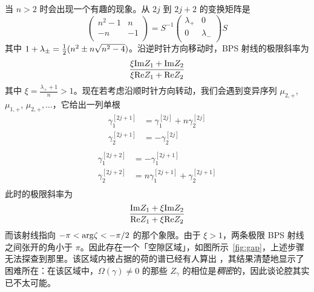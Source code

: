 当 $n>2$ 时会出现一个有趣的现象。从 $2j$ 到 $2j+2$ 的变换矩阵是
%
\begin{equation}
\begin{pmatrix} n^2 -1 & n \\ -n &  -1 \\ \end{pmatrix} = S^{-1} \begin{pmatrix} \lambda_+ & 0 \\
0 & \lambda_- \\ \end{pmatrix} S
\end{equation}
%
其中 $1+\lambda_\pm = \tfrac{1}{2} (n^2  \pm n \sqrt{n^2-4} ) $。沿逆时针方向移动时，BPS 射线的极限斜率为
%
\begin{equation}\label{eq:slope-ccw}
\frac{ \xi {\rm Im}Z_1 +   {\rm Im}Z_2 }{\xi {\rm Re} Z_1 +   {\rm Re} Z_2}
\end{equation}
%
其中 $\xi = \frac{\lambda_+ +1 }{n} > 1$。现在若考虑沿顺时针方向转动，我们会遇到变异序列 $\mu_{2,+}$, $\mu_{1,+}$, $\mu_{2,+},\dots$，它给出一列单根
%
\begin{equation}
\begin{split}
\gamma_1^{[2j+1]} & =   \gamma_1^{[2j]} + n   \gamma_2^{[2j]} \\
\gamma_2^{[2j+1]} & =  -   \gamma_2^{[2j]} \\
\end{split}
\end{equation}
%
\begin{equation}
\begin{split}
\gamma_1^{[2j+2]} & =     -\gamma_1^{[2j+1]}    \\
\gamma_2^{[2j+2]} & = n \gamma_1^{[2j+1]} + \gamma_2^{[2j+1]}  \\
\end{split}
\end{equation}
%
此时的极限斜率为
%
\begin{equation}\label{eq:slope-cw}
\frac{ {\rm Im}Z_1 +  \xi  {\rm Im}Z_2 }{  {\rm Re} Z_1 +  \xi {\rm Re} Z_2}
\end{equation}
%
而该射线指向 $-\pi < {\rm arg}\zeta < -\pi/2$ 的那个象限。由于 $\xi >1$，两条极限 BPS 射线之间张开的角小于 $\pi$。因此存在一个「空隙区域」，如图所示~\ref{fig:gap}，上述步骤无法探查到那里。该区域内被占据的荷的谱已经有人算出 \cite{gctv}，其结果清楚地显示了困难所在：在该区域中，$\Omega(\gamma) \neq 0$ 的那些 $Z_\gamma$ 的相位是\emph{稠密}的，因此谈论腔其实已不太可能。


